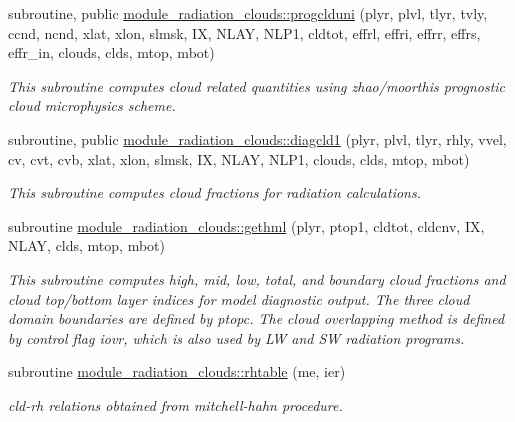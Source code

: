 \begin{DoxyCompactItemize}
\item 
subroutine, public \hyperlink{group__module__radiation__clouds_gaa369e2e2910b3468614db856b378f3ba}{module\+\_\+radiation\+\_\+clouds\+::progclduni} (plyr, plvl, tlyr, tvly, ccnd, ncnd, xlat, xlon, slmsk, IX, N\+L\+AY, N\+L\+P1, cldtot, effrl, effri, effrr, effrs, effr\+\_\+in, clouds, clds, mtop, mbot)
\begin{DoxyCompactList}\small\item\em This subroutine computes cloud related quantities using zhao/moorthi\textquotesingle{}s prognostic cloud microphysics scheme. \end{DoxyCompactList}\end{DoxyCompactItemize}
\begin{DoxyCompactItemize}
\item 
subroutine, public \hyperlink{group__module__radiation__clouds_ga022c3706242426745001b7837ae801a3}{module\+\_\+radiation\+\_\+clouds\+::diagcld1} (plyr, plvl, tlyr, rhly, vvel, cv, cvt, cvb, xlat, xlon, slmsk, IX, N\+L\+AY, N\+L\+P1, clouds, clds, mtop, mbot)
\begin{DoxyCompactList}\small\item\em This subroutine computes cloud fractions for radiation calculations. \end{DoxyCompactList}\end{DoxyCompactItemize}
\begin{DoxyCompactItemize}
\item 
subroutine \hyperlink{group__module__radiation__clouds_gac231d967afcfb252dedba82e9085b34d}{module\+\_\+radiation\+\_\+clouds\+::gethml} (plyr, ptop1, cldtot, cldcnv, IX, N\+L\+AY, clds, mtop, mbot)
\begin{DoxyCompactList}\small\item\em This subroutine computes high, mid, low, total, and boundary cloud fractions and cloud top/bottom layer indices for model diagnostic output. The three cloud domain boundaries are defined by ptopc. The cloud overlapping method is defined by control flag \textquotesingle{}iovr\textquotesingle{}, which is also used by LW and SW radiation programs. \end{DoxyCompactList}\item 
\mbox{\label{group__module__radiation__clouds_ga9b3f43844a53e79cd5c348f8c72ec408}} 
subroutine \hyperlink{group__module__radiation__clouds_ga9b3f43844a53e79cd5c348f8c72ec408}{module\+\_\+radiation\+\_\+clouds\+::rhtable} (me, ier)
\begin{DoxyCompactList}\small\item\em cld-\/rh relations obtained from mitchell-\/hahn procedure. \end{DoxyCompactList}\end{DoxyCompactItemize}


